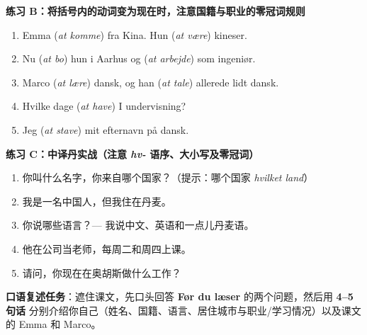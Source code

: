 \textbf{练习 B：将括号内的动词变为现在时，注意国籍与职业的零冠词规则}
\begin{enumerate}
  \item Emma \underline{\hspace{2.0cm}} (\textit{at komme}) fra Kina. Hun \underline{\hspace{2.0cm}} (\textit{at være}) kineser.
  \item Nu \underline{\hspace{2.0cm}} (\textit{at bo}) hun i Aarhus og \underline{\hspace{2.0cm}} (\textit{at arbejde}) som ingeniør.
  \item Marco \underline{\hspace{2.0cm}} (\textit{at lære}) dansk, og han \underline{\hspace{2.0cm}} (\textit{at tale}) allerede lidt dansk.
  \item Hvilke dage \underline{\hspace{2.0cm}} (\textit{at have}) I undervisning?
  \item Jeg \underline{\hspace{2.0cm}} (\textit{at stave}) mit efternavn på dansk.
\end{enumerate}

\textbf{练习 C：中译丹实战（注意 \textit{hv-} 语序、大小写及零冠词）}
\begin{enumerate}
  \item 你叫什么名字，你来自哪个国家？（提示：哪个国家 \textit{hvilket land}）
  \item 我是一名中国人，但我住在丹麦。
  \item 你说哪些语言？--- 我说中文、英语和一点儿丹麦语。
  \item 他在公司当老师，每周二和周四上课。
  \item 请问，你现在在奥胡斯做什么工作？
\end{enumerate}


\textbf{口语复述任务}：遮住课文，先口头回答 \textbf{Før du læser} 的两个问题，然后用 \textbf{4--5 句话} 分别介绍你自己（姓名、国籍、语言、居住城市与职业/学习情况）以及课文的 Emma 和 Marco。

